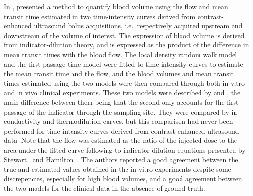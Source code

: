 In \citeyear{Mischi:2004cn}, \citet{Mischi:2004cn} presented a method to quantify blood volume using the flow and mean transit time estimated in two time-intensity curves derived from contrast-enhanced ultrasound bolus acquisitions, i.e.~respectively acquired upstream and downstream of the volume of interest.
The expression of blood volume is derived from indicator-dilution theory, and is expressed as the product of the difference in mean transit times with the blood flow.
The local density random walk model and the first passage time model were fitted to time-intensity curves to estimate the mean transit time and the flow, and the blood volumes and mean transit times estimated using the two models were then compared through both in vitro and in vivo clinical experiments.
These two models were described by \citet{Walley:1964fr} and \citet{Wise:1966wy}, the main difference between them being that the second only accounts for the first passage of the indicator through the sampling site.
They were compared by \citet{Bogaard:1986wp} in conductivity and thermodilution curves, but this comparison had never been performed for time-intensity curves derived from contrast-enhanced ultrasound data.
Note that the flow was estimated as the ratio of the injected dose to the area under the fitted curve following to indicator-dilution equations presented by Stewart~\cite{Stewart:1897dz} and Hamilton~\cite{Hamilton:1932ww}.
The authors reported a good agreement between the true and estimated values obtained in the in vitro experiments despite some discrepencies, especially for high blood volumes, and a good agreement between the two models for the clinical data in the absence of ground truth.

